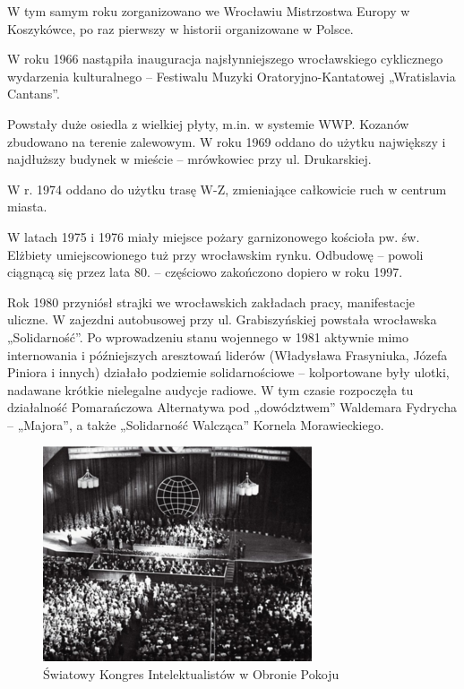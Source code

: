 \documentclass{article}
\begin{document}
W tym samym roku zorganizowano we Wrocławiu Mistrzostwa Europy w Koszykówce, po raz pierwszy w historii organizowane w Polsce.

W roku 1966 nastąpiła inauguracja najsłynniejszego wrocławskiego cyklicznego wydarzenia kulturalnego – Festiwalu Muzyki Oratoryjno-Kantatowej „Wratislavia Cantans”.

Powstały duże osiedla z wielkiej płyty, m.in. w systemie WWP. Kozanów zbudowano na terenie zalewowym. W roku 1969 oddano do użytku największy i najdłuższy budynek w mieście – mrówkowiec przy ul. Drukarskiej.

W r. 1974 oddano do użytku trasę W-Z, zmieniające całkowicie ruch w centrum miasta.

W latach 1975 i 1976 miały miejsce pożary garnizonowego kościoła pw. św. Elżbiety umiejscowionego tuż przy wrocławskim rynku. Odbudowę – powoli ciągnącą się przez lata 80. – częściowo zakończono dopiero w roku 1997.

Rok 1980 przyniósł strajki we wrocławskich zakładach pracy, manifestacje uliczne. W zajezdni autobusowej przy ul. Grabiszyńskiej powstała wrocławska „Solidarność”. Po wprowadzeniu stanu wojennego w 1981 aktywnie mimo internowania i późniejszych aresztowań liderów (Władysława Frasyniuka, Józefa Piniora i innych) działało podziemie solidarnościowe – kolportowane były ulotki, nadawane krótkie nielegalne audycje radiowe. W tym czasie rozpoczęła tu działalność Pomarańczowa Alternatywa pod „dowództwem” Waldemara Fydrycha – „Majora”, a także „Solidarność Walcząca” Kornela Morawieckiego.

\begin{figure}[htbp!]
\centering
\includegraphics[scale=1.0]{16.png}
\caption{Światowy Kongres Intelektualistów w Obronie Pokoju}
\label{fig:14}
\end{figure}
\end{document}
